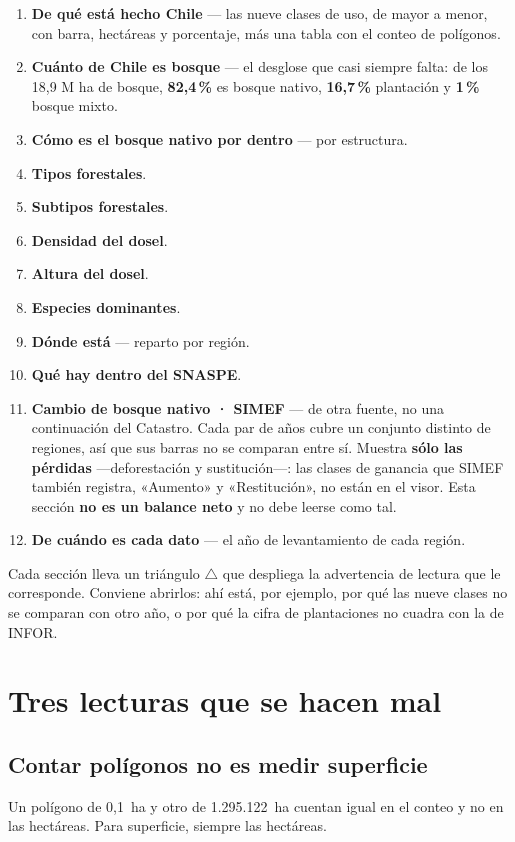 \documentclass[11pt,a4paper]{report}
\newcommand{\campo}[1]{\textcolor{conaf}{\textbf{#1}}}
\begin{document}
\begin{enumerate}
  \item \campo{De qué está hecho Chile} — las nueve clases de uso, de mayor a
        menor, con barra, hectáreas y porcentaje, más una tabla con el conteo de
        polígonos.
  \item \campo{Cuánto de Chile es bosque} — el desglose que casi siempre falta:
        de los 18,9 M ha de bosque, \textbf{82,4\,\%} es bosque nativo,
        \textbf{16,7\,\%} plantación y \textbf{1\,\%} bosque mixto.
  \item \campo{Cómo es el bosque nativo por dentro} — por estructura.
  \item \campo{Tipos forestales}.
  \item \campo{Subtipos forestales}.
  \item \campo{Densidad del dosel}.
  \item \campo{Altura del dosel}.
  \item \campo{Especies dominantes}.
  \item \campo{Dónde está} — reparto por región.
  \item \campo{Qué hay dentro del SNASPE}.
  \item \campo{Cambio de bosque nativo · SIMEF} — de otra fuente, no una
        continuación del Catastro. Cada par de años cubre un conjunto distinto
        de regiones, así que sus barras no se comparan entre sí. Muestra
        \campo{sólo las pérdidas} —deforestación y sustitución—: las clases de
        ganancia que SIMEF también registra, «Aumento» y «Restitución», no están
        en el visor. Esta sección \campo{no es un balance neto} y no debe
        leerse como tal.
  \item \campo{De cuándo es cada dato} — el año de levantamiento de cada región.
\end{enumerate}

Cada sección lleva un triángulo \textbf{\textcolor{aviso}{$\triangle$}} que
despliega la advertencia de lectura que le corresponde. Conviene abrirlos: ahí
está, por ejemplo, por qué las nueve clases no se comparan con otro año, o por
qué la cifra de plantaciones no cuadra con la de INFOR.

\section{Tres lecturas que se hacen mal}

\subsection{Contar polígonos no es medir superficie}
Un polígono de 0,1~ha y otro de 1.295.122~ha cuentan igual en el conteo y no en
las hectáreas. Para superficie, siempre las hectáreas.
\end{document}
